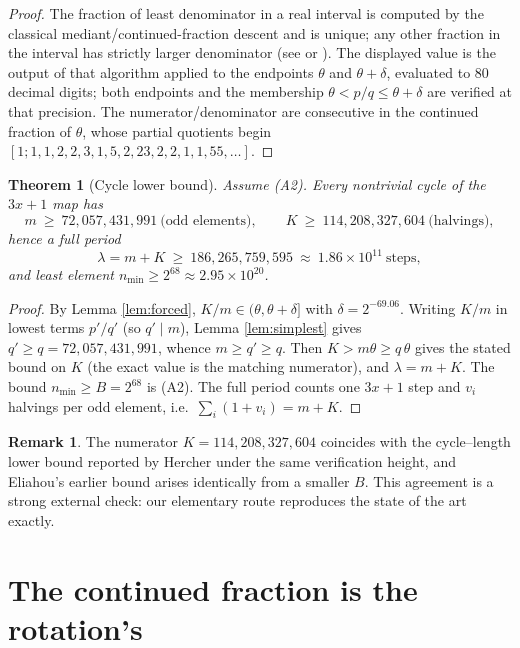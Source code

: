 \documentclass[11pt]{article}
\newtheorem{theorem}{Theorem}
\theoremstyle{definition}
\newtheorem{remark}{Remark}
\newcommand{\nmin}{n_{\min}}
\begin{document}
\begin{proof}
The fraction of least denominator in a real interval is computed by the classical
mediant/continued-fraction descent and is unique; any other fraction in the
interval has strictly larger denominator (see \cite[Ch.~I]{khinchin} or
\cite{stern-brocot}). The displayed value is the output of that algorithm applied
to the endpoints $\theta$ and $\theta+\delta$, evaluated to $80$ decimal digits;
both endpoints and the membership $\theta < p/q \le \theta+\delta$ are verified at
that precision. The numerator/denominator are consecutive in the continued
fraction of $\theta$, whose partial quotients begin
$[1;1,1,2,2,3,1,5,2,23,2,2,1,1,55,\ldots]$.
\end{proof}

\begin{theorem}[Cycle lower bound]\label{thm:main}
Assume (A2). Every nontrivial cycle of the $3x+1$ map has
\[
  m \ \ge\ 72{,}057{,}431{,}991 \ \text{(odd elements)}, \qquad
  K \ \ge\ 114{,}208{,}327{,}604 \ \text{(halvings)},
\]
hence a full period
\[
  \lambda = m + K \ \ge\ 186{,}265{,}759{,}595 \ \approx\ 1.86\times10^{11}
  \ \text{steps},
\]
and least element $\nmin \ge 2^{68} \approx 2.95\times10^{20}$.
\end{theorem}

\begin{proof}
By Lemma \ref{lem:forced}, $K/m \in (\theta,\theta+\delta]$ with
$\delta = 2^{-69.06}$. Writing $K/m$ in lowest terms $p'/q'$ (so $q' \mid m$),
Lemma \ref{lem:simplest} gives $q' \ge q = 72{,}057{,}431{,}991$, whence
$m \ge q' \ge q$. Then $K > m\theta \ge q\,\theta$ gives the stated bound on $K$
(the exact value is the matching numerator), and $\lambda = m+K$. The bound
$\nmin \ge B = 2^{68}$ is (A2). The full period counts one $3x+1$ step and $v_i$
halvings per odd element, i.e.\ $\sum_i (1+v_i) = m+K$.
\end{proof}

\begin{remark}
The numerator $K = 114{,}208{,}327{,}604$ coincides with the cycle--length lower
bound reported by Hercher \cite{hercher} under the same verification height, and
Eliahou's earlier bound \cite{eliahou} arises identically from a smaller $B$.
This agreement is a strong external check: our elementary route reproduces the
state of the art exactly.
\end{remark}

\section{The continued fraction is the rotation's}\label{sec:cf}
\end{document}
